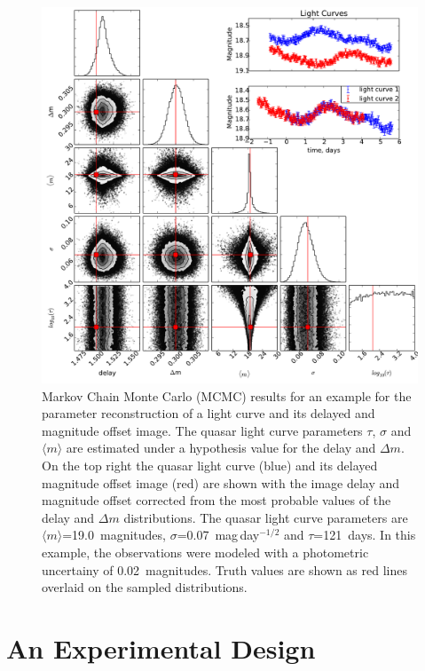\documentclass{emulateapj}
\begin{document}
\begin{figure}[t]
\begin{center}
\includegraphics[width=\linewidth]{./triangle_example_2.pdf}
\caption{ Markov Chain Monte Carlo (MCMC) results for an example for
  the parameter reconstruction of a light curve and its delayed and
  magnitude offset image. The quasar light curve parameters $\tau$,
  $\sigma$ and $\langle m \rangle$ are estimated under a hypothesis
  value for the delay and $\Delta m$. On the top right the quasar
  light curve (blue) and its delayed magnitude offset image (red) are
  shown with the image delay and magnitude offset corrected from the
  most probable values of the delay and $\Delta m$ distributions. The
  quasar light curve parameters are $\langle m
  \rangle$=19.0~magnitudes, $\sigma$=0.07~mag\,day$^{-1/2}$ and
  $\tau$=121~days. In this example, the observations were modeled with
  a photometric uncertainy of 0.02~magnitudes. Truth values are shown
  as red lines overlaid on the sampled
  distributions.}\label{fig:triangle}
\end{center}
\end{figure}

\section{An Experimental Design}\label{sec:experiment}
\end{document}
